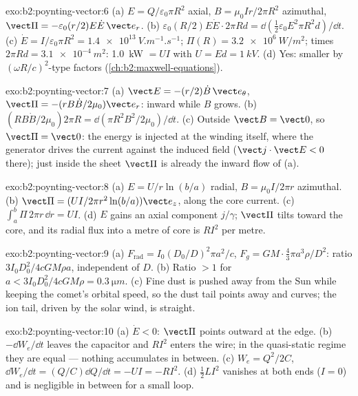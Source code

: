\begin{solution}{exo:b2:poynting-vector:6}
(a) $E = Q/\varepsilon_0\pi R^2$ axial, $B = \mu_0Ir/2\pi R^2$ azimuthal, $\vect\Pi = -\varepsilon_0
(r/2)E\dot E\,\vect e_r$. (b) $\varepsilon_0(R/2)E\dot E\cdot2\pi Rd = \dd(\tfrac12\varepsilon_0E^2\pi R^2d)/
\dd t$. (c) $\dot E = I/\varepsilon_0\pi R^2 = \qty{1.4e13}{V.m^{-1}.s^{-1}}$; $\Pi(R) = \qty{3.2e6}{W/m^2}$;
times $2\pi Rd = \qty{3.1e-4}{m^2}$: \qty{1.0}{kW} $= UI$ with $U = Ed = \qty{1}{kV}$. (d)
Yes: smaller by $(\omega R/c)^2$-type factors (\cref{ch:b2:maxwell-equations}).
\end{solution}

\begin{solution}{exo:b2:poynting-vector:7}
(a) $\vect E = -(r/2)\dot B\,\vect e_\theta$, $\vect\Pi = -(rB\dot B/2\mu_0)\vect e_r$: inward
while $B$ grows. (b) $(RB\dot B/2\mu_0)2\pi R = \dd(\pi R^2B^2/2\mu_0)/\dd t$. (c)
Outside $\vect B = \vect 0$, so $\vect\Pi = \vect 0$: the energy is injected at the
winding itself, where the generator drives the current against the
induced field ($\vect j\cdot\vect E < 0$ there); just inside the sheet
$\vect\Pi$ is already the inward flow of (a).
\end{solution}

\begin{solution}{exo:b2:poynting-vector:8}
(a) $E = U/r\ln(b/a)$ radial, $B = \mu_0I/2\pi r$ azimuthal. (b) $\vect\Pi = (UI/
2\pi r^2\ln(b/a))\vect e_z$, along the core current. (c) $\int_a^b\Pi\,2\pi r\,\dd r =
UI$. (d) $E$ gains an axial component $j/\gamma$; $\vect\Pi$ tilts toward the
core, and its radial flux into a metre of core is $RI^2$ per metre.
\end{solution}

\begin{solution}{exo:b2:poynting-vector:9}
(a) $F_{\text{rad}} = I_0(D_0/D)^2\pi a^2/c$, $F_g = GM\cdot\tfrac43\pi a^3\rho/D^2$: ratio
$3I_0D_0^2/4cGM\rho a$, independent of $D$. (b) Ratio $> 1$ for $a < 3I_0D_0^2/
4cGM\rho = \qty{0.3}{\micro m}$. (c) Fine dust is pushed away from the Sun while
keeping the comet's orbital speed, so the dust tail points away and
curves; the ion tail, driven by the solar wind, is straight.
\end{solution}

\begin{solution}{exo:b2:poynting-vector:10}
(a) $\dot E < 0$: $\vect\Pi$ points outward at the edge. (b) $-\dd W_e/\dd t$
leaves the capacitor and $RI^2$ enters the wire; in the quasi-static
regime they are equal --- nothing accumulates in between. (c) $W_e =
Q^2/2C$, $\dd W_e/\dd t = (Q/C)\dd Q/\dd t = -UI = -RI^2$. (d) $\tfrac12LI^2$
vanishes at both ends ($I = 0$) and is negligible in between for a small
loop.
\end{solution}

